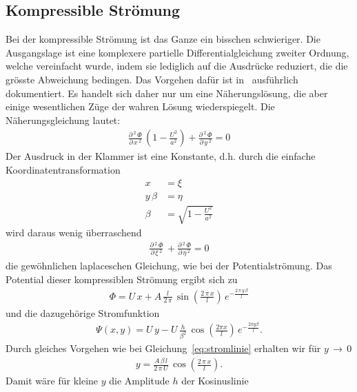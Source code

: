 \subsection{Kompressible Strömung}
Bei der kompressible Strömung ist das Ganze ein bisschen schwieriger.
Die Ausgangslage ist eine komplexere partielle 
Differentialgleichung zweiter Ordnung, welche vereinfacht
wurde, indem sie lediglich auf die Ausdrücke reduziert, die 
die grösste Abweichung bedingen.
Das Vorgehen dafür ist in~\cite{Ackeret1928} ausführlich dokumentiert.
Es handelt sich daher nur um eine Näherungslösung,
die aber einige wesentlichen Züge der wahren Lösung wiederspiegelt.
Die Näherungsgleichung lautet:
\begin{align}
    \frac{\partial\,^2\,\Phi}{\partial\,x\,^2}\,
    \left(1-\frac{U^2}{a^2}\right)
    +
    \frac{\partial\,^2\,\Phi}{\partial\,y\,^2}
    =
    0\label{eq:kompressible_stroemung}
\end{align}
Der Ausdruck in der Klammer ist eine Konstante, d.h.
durch die einfache Koordinatentransformation
\begin{align*}
    x 
    &=
    \xi \\
    y\,\beta
    &=
    \eta \\
    \beta
    &=
    \sqrt{1-\frac{U^2}{a^2}}
\end{align*}
wird daraus wenig überraschend
\begin{align*}
    \frac{\partial\,^2\,\Phi}{\partial\,\xi\,^2}\,
    +
    \frac{\partial\,^2\,\Phi}{\partial\,\eta\,^2}
    =
    0
\end{align*}
die gewöhnlichen laplaceschen Gleichung, wie
bei der Potentialströmung.
Das Potential dieser kompressiblen Strömung ergibt sich zu
\begin{align*}
    \Phi
    =
    U\,x + A\,\frac{l}{2\,\pi}\,\sin\left(\frac{2\,\pi\,x}{l}\right)
    \,e^{-\frac{2\,\pi\,y\,\beta}{l}}
\end{align*}
und die dazugehörige Stromfunktion
\begin{align*}
    \Psi(x, y)
    =
    U\,y - U\,\frac{h}{\beta^2}\,\cos\left(\frac{2\pi x}{l}\right)
    \,e^{-\frac{2\pi y \beta}{l}}.
\end{align*}
Durch gleiches Vorgehen wie bei Gleichung~\eqref{eq:stromlinie}
erhalten wir für $y\,\to\,0$
\begin{align*}
    y
    =
    \frac{A\,\beta\,l}{2\,\pi\,U}\,
    \cos\left(\frac{2\,\pi\,x}{l}\right).
\end{align*}
Damit wäre für kleine $y$ die Amplitude $h$ der Kosinuslinie
